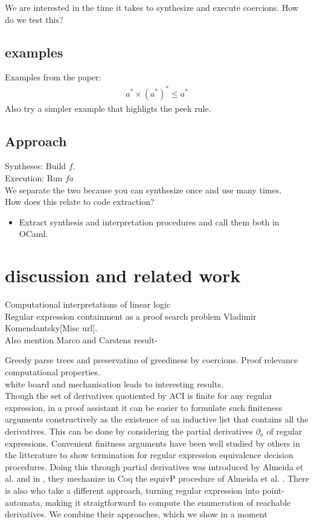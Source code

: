 \documentclass[a4paper,UKenglish,cleveref, autoref, thm-restate]{lipics-v2021}
\newcommand\mycomment[1]{}
\begin{document}
We are interested in the time it takes to synthesize and execute coercions. How do we test this?\\
\subsection{examples}
Examples from the paper:\\
\begin{align}
a ^* \times (a^*)^* \leq a^*
\end{align}
Also try a simpler example that highligts the peek rule. 
\subsection{Approach}
Syntheses: Build $f$.\\
Execution: Run $f a$\\
We separate the two because you can synthesize once and use many times.\\
How does this relate to code extraction?
\begin{itemize}
\item Extract synthesis and interpretation procedures and call them both in OCaml. 
\end{itemize}

\section{discussion and related work}
Computational interpretations of linear logic \cite{A93}\\
Regular expression containment as a proof search problem Vladimir Komendantsky[Misc url].\\
Also mention Marco and Carstens result-

Greedy parse trees and preservatino of greediness by coercions. Proof relevance computational properties.\\
white board and mechanisation leads to interesting results.
\\
Though the set of derivatives quotiented by ACI is finite for any regular expression, in a proof assistant it can be easier to formulate such finiteness arguments constructively as the existence of an inductive list that contains all the derivatives. This can be done by considering the partial derivatives $\partial_a$ of regular expressions. Convenient finitness arguments have been well studied by others in the litterature to show termination for regular expression equivalence decision procedures. Doing this through partial derivatives was introduced by Almeida et al. \cite{AMR09} and in \cite{MPS12}, they mechanize in Coq the \textsf{equivP} procedure of Almeida et al. \mycomment{How does their termination argument work?}. There is also \cite{A12} who take a different approach, turning regular expression into point-automata, making it straigtforward to compute the enumeration of reachable derivatives. We combine their approaches, which we show in a moment
\mycomment{Two files for this, extensional and extensionalpartial which one is correct I think extensional partial, clean up code later}\\
  
\end{document}
